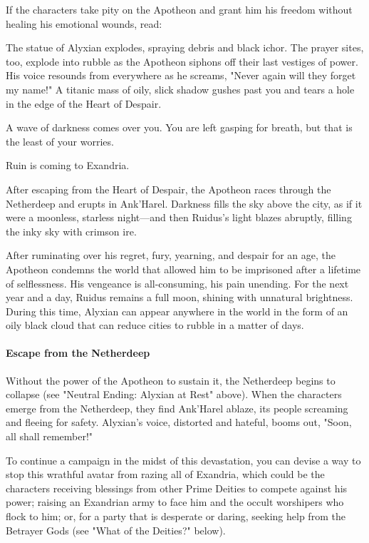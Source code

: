 \documentclass[10pt,a4paper,twoside,twocolumn,openany,nodeprecatedcode]{dndbook}
\begin{document}
If the characters take pity on the Apotheon and grant him his freedom without healing his emotional wounds, read:

\begin{DndReadAloud}{}
The statue of Alyxian explodes, spraying debris and black ichor. The prayer sites, too, explode into rubble as the Apotheon siphons off their last vestiges of power. His voice resounds from everywhere as he screams, "Never again will they forget my name!" A titanic mass of oily, slick shadow gushes past you and tears a hole in the edge of the Heart of Despair.

A wave of darkness comes over you. You are left gasping for breath, but that is the least of your worries.

Ruin is coming to Exandria.

\end{DndReadAloud}

After escaping from the Heart of Despair, the Apotheon races through the Netherdeep and erupts in Ank'Harel. Darkness fills the sky above the city, as if it were a moonless, starless night—and then Ruidus's light blazes abruptly, filling the inky sky with crimson ire.

After ruminating over his regret, fury, yearning, and despair for an age, the Apotheon condemns the world that allowed him to be imprisoned after a lifetime of selflessness. His vengeance is all-consuming, his pain unending. For the next year and a day, Ruidus remains a full moon, shining with unnatural brightness. During this time, Alyxian can appear anywhere in the world in the form of an oily black cloud that can reduce cities to rubble in a matter of days.

\paragraph{Escape from the Netherdeep}
Without the power of the Apotheon to sustain it, the Netherdeep begins to collapse (see "Neutral Ending: Alyxian at Rest" above). When the characters emerge from the Netherdeep, they find Ank'Harel ablaze, its people screaming and fleeing for safety. Alyxian's voice, distorted and hateful, booms out, "Soon, all shall remember!"

To continue a campaign in the midst of this devastation, you can devise a way to stop this wrathful avatar from razing all of Exandria, which could be the characters receiving blessings from other Prime Deities to compete against his power; raising an Exandrian army to face him and the occult worshipers who flock to him; or, for a party that is desperate or daring, seeking help from the Betrayer Gods (see "What of the Deities?" below).
\end{document}
